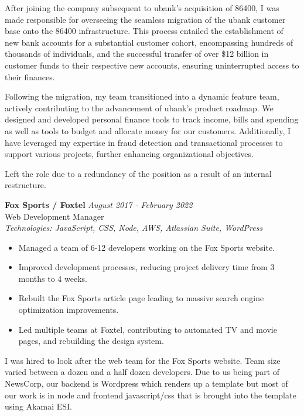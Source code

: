 \documentclass[a4paper,10pt]{article}
\begin{document}
After joining the company subsequent to ubank's acquisition of 86400, I was made responsible for overseeing the 
seamless migration of the ubank customer base onto the 86400 infrastructure. This process entailed the establishment
of new bank accounts for a substantial customer cohort, encompassing hundreds of thousands of individuals, and the 
successful transfer of over \$12 billion in customer funds to their respective new accounts, ensuring uninterrupted 
access to their finances.

Following the migration, my team transitioned into a dynamic feature team, actively contributing to the advancement 
of ubank's product roadmap. We designed and developed personal finance tools to track income, bills and spending as 
well as tools to budget and allocate money for our customers. Additionally, I have leveraged my expertise in fraud 
detection and transactional processes to support various projects, further enhancing organizational objectives.

Left the role due to a redundancy of the position as a result of an internal restructure.

\vspace{1em}

\textbf{Fox Sports / Foxtel} \hfill \textit{August 2017 - February 2022} \\
Web Development Manager \\
\textit{Technologies: JavaScript, CSS, Node, AWS, Atlassian Suite, WordPress}
\begin{itemize}
    \item Managed a team of 6-12 developers working on the Fox Sports website.
    \item Improved development processes, reducing project delivery time from 3 months to 4 weeks.
    \item Rebuilt the Fox Sports article page leading to massive search engine optimization improvements.
    \item Led multiple teams at Foxtel, contributing to automated TV and movie pages, and rebuilding the design system.
\end{itemize}

I was hired to look after the web team for the Fox Sports website. Team size varied between a dozen and a half dozen 
developers. Due to us being part of NewsCorp, our backend is Wordpress which renders up a template but most of our 
work is in node and frontend javascript/css that is brought into the template using Akamai ESI.
\end{document}
